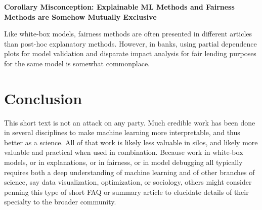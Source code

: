 \documentclass{article}
\begin{document}
\textbf{Corollary Misconception: Explainable ML Methods and Fairness Methods are Somehow Mutually Exclusive}

Like white-box models, fairness methods are often presented in different articles than post-hoc explanatory methods. However, in banks, using partial dependence plots for model validation and disparate impact analysis for fair lending purposes for the same model is somewhat commonplace.

\section{Conclusion}

This short text is not an attack on any party. Much credible work has been done in several disciplines to make machine learning more interpretable, and thus better as a science. All of that work is likely less valuable in silos, and likely more valuable and practical when used in combination. Because work in white-box models, or in explanations, or in fairness, or in model debugging all typically requires both a deep understanding of machine learning and of other branches of science, say data visualization, optimization, or sociology, others might consider penning this type of short FAQ or summary article to elucidate details of their specialty to the broader community.    




\end{document}
